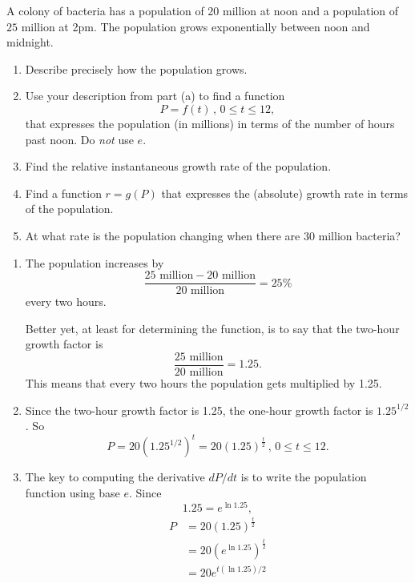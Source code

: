 \documentclass{ximera}
\begin{document}
\begin{question}  \label{Qfyhyhgrrrreee}
A colony of bacteria has a population of $20$ million at noon and a population of $25$ million at 2pm. The population grows exponentially between noon and midnight.

\begin{enumerate}
\item Describe precisely how the population grows.

\item Use your description from part (a) to find a function 
\[
   P=f(t) \, , \, 0\leq t \leq 12,
\]
that expresses the population (in millions) in terms of the number of hours past noon. Do \emph{not} use $e$.

\item Find the relative instantaneous growth rate of the population.

\item Find a function $r=g(P)$ that expresses the (absolute) growth rate in terms of the population.

\item At what rate is the population changing when there are $30$ million bacteria?
\end{enumerate}

\begin{explanation}
\begin{enumerate}
\item The population increases by 
\[
  \frac{25\text{ million} - 20\text{ million}}{20\text{ million}} = 25\%
\]
every two hours. 

Better yet, at least for determining the function, is to say  that the two-hour growth factor is
\[
\frac{25\text{ million}}{20\text{ million}} = 1.25 .
\]
This means that every two hours the population gets multiplied by 1.25.

\item Since the two-hour growth factor is 1.25, the one-hour growth factor is $1.25^{1/2}$. So 
\[
       P = 20(1.25^{1/2})^t = 20(1.25)^{\frac{t}{2}} \, , \, 0\leq t \leq 12.
\]
 
\item The key to computing the derivative $dP/dt$ is to write the population function using base $e$. Since
\[
       1.25 = e^{\ln 1.25},
\]
\begin{align*}
      P &= 20(1.25)^{\frac{t}{2}}  \\
         &= 20 \left( e^{\ln 1.25} \right)^{\frac{t}{2}} \\
         &=  20 e^{t (\ln 1.25)/2}
\end{align*}



\end{enumerate}
\end{explanation}
\end{question}
\end{document}

